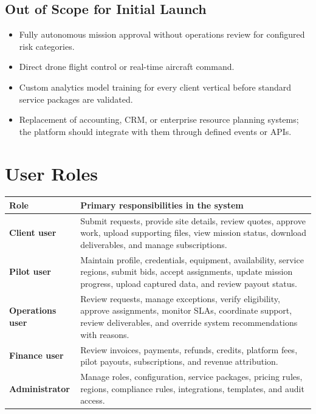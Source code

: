 \documentclass[11pt,a4paper]{article}
\begin{document}
\subsection*{Out of Scope for Initial Launch}

\begin{itemize}[leftmargin=*]
    \item Fully autonomous mission approval without operations review for configured risk categories.
    \item Direct drone flight control or real-time aircraft command.
    \item Custom analytics model training for every client vertical before standard service packages are validated.
    \item Replacement of accounting, CRM, or enterprise resource planning systems; the platform should integrate with them through defined events or APIs.
\end{itemize}

\section{User Roles}

\begin{longtable}{>{\bfseries}p{}p{}}
\toprule
Role & Primary responsibilities in the system \\
\midrule
Client user & Submit requests, provide site details, review quotes, approve work, upload supporting files, view mission status, download deliverables, and manage subscriptions. \\
Pilot user & Maintain profile, credentials, equipment, availability, service regions, submit bids, accept assignments, update mission progress, upload captured data, and review payout status. \\
Operations user & Review requests, manage exceptions, verify eligibility, approve assignments, monitor SLAs, coordinate support, review deliverables, and override system recommendations with reasons. \\
Finance user & Review invoices, payments, refunds, credits, platform fees, pilot payouts, subscriptions, and revenue attribution. \\
Administrator & Manage roles, configuration, service packages, pricing rules, regions, compliance rules, integrations, templates, and audit access. \\
\bottomrule
\end{longtable}
\end{document}
